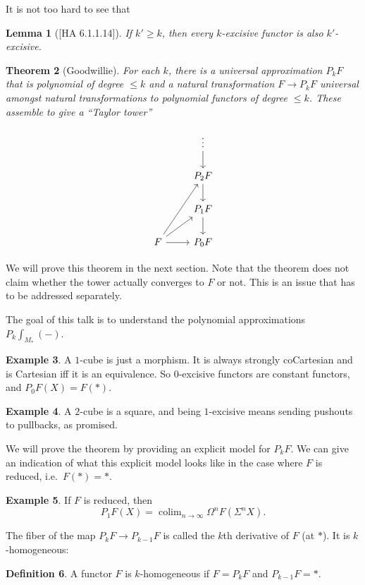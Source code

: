 \documentclass{shortart}
\newtheorem{lemma}{Lemma}
\newtheorem{thm}[lemma]{Theorem}
\theoremstyle{definition}
\newtheorem{defi}[lemma]{Definition}
\newtheorem{eg}[lemma]{Example}
\DeclareMathOperator*\colim{colim}
\begin{document}
It is not too hard to see that
\begin{lemma}[{[HA 6.1.1.14]}]
  If $k' \geq k$, then every $k$-excisive functor is also $k'$-excisive.
\end{lemma}

\begin{thm}[Goodwillie]
  For each $k$, there is a universal approximation $P_k F$ that is polynomial of degree $\leq k$ and a natural transformation $F \to P_k F$ universal amongst natural transformations to polynomial functors of degree $\leq k$. These assemble to give a ``Taylor tower''
  \begin{useimager}
    \[
      \begin{tikzcd}
        & \vdots \ar[d]\\
        & P_2 F \ar[d]\\
        & P_1 F \ar[d]\\
        F \ar[r] \ar[ur] \ar[uur] & P_0 F
      \end{tikzcd}
    \]
  \end{useimager}
\end{thm}
We will prove this theorem in the next section. Note that the theorem does not claim whether the tower actually converges to $F$ or not. This is an issue that has to be addressed separately.

The goal of this talk is to understand the polynomial approximations $P_k \int_{M_*}(-)$.

\begin{eg}
  A $1$-cube is just a morphism. It is always strongly coCartesian and is Cartesian iff it is an equivalence. So $0$-excisive functors are constant functors, and $P_0 F(X) = F(*)$.
\end{eg}

\begin{eg}
  A $2$-cube is a square, and being $1$-excisive means sending pushouts to pullbacks, as promised.
\end{eg}

We will prove the theorem by providing an explicit model for $P_k F$. We can give an indication of what this explicit model looks like in the case where $F$ is reduced, i.e.\ $F(*) = *$.
\begin{eg}
  If $F$ is reduced, then
  \[
    P_1 F(X) = \colim_{n \to \infty} \Omega^n F(\Sigma^n X).
  \]
\end{eg}

The fiber of the map $P_k F \to P_{k - 1} F$ is called the $k$th derivative of $F$ (at $*$). It is $k$-homogeneous:
\begin{defi}
  A functor $F$ is $k$-homogeneous if $F = P_k F$ and $P_{k - 1}F = *$.
\end{defi}
\end{document}
